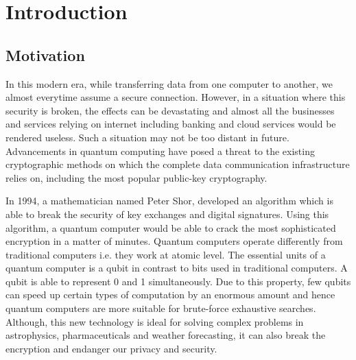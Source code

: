 \chapter{Introduction}
\label{chap:intro}
\setlength{\parskip}{1.5mm}
\section{Motivation}

In this modern era, while transferring data from one computer to another, we almost everytime assume a secure connection. However, in a situation where this security is broken, the effects can be devastating and almost all the businesses and services relying on internet including banking and cloud services would be rendered useless. Such a situation may not be too distant in future. Advancements in quantum computing have posed a threat to the existing cryptographic methods on which the complete data communication infrastructure relies on, including the most popular public-key cryptography.

In 1994, a mathematician named Peter Shor, developed an algorithm which is able to break the security of key exchanges and digital signatures. Using this algorithm, a quantum computer would be able to crack the most sophisticated encryption in a matter of minutes. Quantum computers operate differently from traditional computers i.e. they work at atomic level. The essential units of a quantum computer is a qubit in contrast to bits used in traditional computers. A qubit is able to represent 0 and 1 simultaneously. Due to this property, few qubits can speed up certain types of computation by an enormous amount and hence quantum computers are more suitable for brute-force exhaustive searches. Although, this new technology is ideal for solving complex problems in astrophysics, pharmaceuticals and weather forecasting, it can also break the encryption and endanger our privacy and security.\\\\\\


